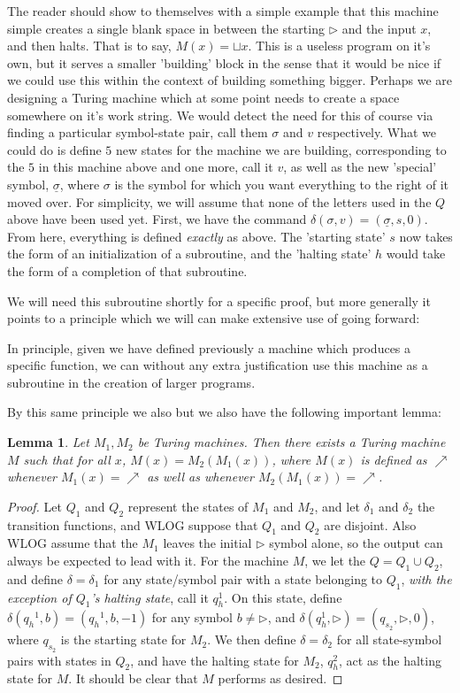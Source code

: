 \documentclass{article}
\theoremstyle{definition}
\theoremstyle{plain}
\theoremstyle{theorem}
\newtheorem{lemma}{Lemma}[section]
\begin{document}
The reader should show to themselves with a simple example that this machine simple creates a single blank space in between the starting $\triangleright$ and the input $x$, and then halts. That is to say, $M(x) = \sqcup x$. This is a useless program on it's own, but it serves a smaller 'building' block in the sense that it would be nice if we could use this within the context of building something bigger. Perhaps we are designing a Turing machine which at some point needs to create a space somewhere on it's work string. We would detect the need for this of course via finding a particular symbol-state pair, call them $\sigma$ and $v$ respectively. What we could do is define $5$ new states for the machine we are building, corresponding to the $5$ in this machine above and one more, call it $v$, as well as the new 'special' symbol, $\underline{\sigma}$, where $\sigma$ is the symbol for which you want everything to the right of it moved over. For simplicity, we will assume that none of the letters used in the $Q$ above have been used yet. First, we have the command $\delta(\sigma,v) = (\underline{\sigma},s,0)$. From here, everything is defined \textit{exactly} as above. The 'starting state' $s$ now takes the form of an initialization of a subroutine, and the 'halting state' $h$ would take the form of a completion of that subroutine. \par We will need this subroutine shortly for a specific proof, but more generally it points to a principle which we will can make extensive use of going forward:
\begin{center}
	In principle, given we have defined previously a machine which produces a specific function, we can without any extra justification use this machine as a subroutine in the creation of larger programs. 
\end{center}
	By this same principle we also but we also have the following important lemma:
\begin{lemma}
    Let $M_1,M_2$ be Turing machines. Then there exists a Turing machine $M$ such that for all $x$, $M(x) = M_2(M_1(x))$, where $M(x)$ is defined as $\nearrow$ whenever $M_1(x) = \nearrow$ as well as whenever $M_2(M_1(x)) = \nearrow$. 
\end{lemma}
\begin{proof}
    Let $Q_1$ and $Q_2$ represent the states of $M_1$ and $M_2$, and let $\delta_1$ and $\delta_2$ the transition functions, and WLOG suppose that $Q_1$ and $Q_2$ are disjoint. 
    Also WLOG assume that the $M_1$ leaves the initial $\triangleright$ symbol alone, so the output can always be expected to lead with it. For the machine $M$, we let the $Q=Q_1 \cup Q_2$, and define $\delta = \delta_1$ for any state/symbol pair with a state belonging to $Q_1$, \textit{with the exception of $Q_1$'s halting state}, call it $q_h^1$. 
    On this state, define $\delta({q_h}^1,b) = ({q_h}^1,b,-1)$ for any symbol $b \neq \triangleright$, and $\delta(q_h^1,\triangleright)=(q_{s_2},\triangleright,0)$, where $q_{s_2}$ is the starting state for $M_2$. We then define $\delta = \delta_2$ for all state-symbol pairs with states in $Q_2$, and have the halting state for $M_2$, $q_h^2$, act as the halting state for $M$. It should be clear that $M$ performs as desired. 
\end{proof}
\end{document}
